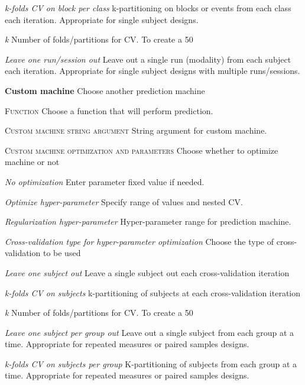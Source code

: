 \textit{k-folds CV on block per class}
k-partitioning on blocks or events from each class each iteration. Appropriate for single subject designs.


\textit{k}
Number of folds/partitions for CV. To create a 50%


\textit{Leave one run/session out}
Leave out a single run (modality) from each subject each iteration. Appropriate for single subject designs with multiple runs/sessions.


\textbf{Custom machine}
Choose another prediction machine


\textsc{Function}
Choose a function that will perform prediction.


\textsc{Custom machine string argument}
String argument for custom machine.


\textsc{Custom machine optimization and parameters}
Choose whether to optimize machine or not


\textsl{No optimization}
Enter parameter fixed value if needed.


\textsl{Optimize hyper-parameter}
Specify range of values and nested CV.


\textit{Regularization hyper-parameter}
Hyper-parameter range for prediction machine.


\textit{Cross-validation type for hyper-parameter optimization}
Choose the type of cross-validation to be used


\textit{Leave one subject out}
Leave a single subject out each cross-validation iteration


\textit{k-folds CV on subjects}
k-partitioning of subjects at each cross-validation iteration


\textit{k}
Number of folds/partitions for CV. To create a 50%


\textit{Leave one subject per group out}
Leave out a single subject from each group at a time. Appropriate for repeated measures or paired samples designs.


\textit{k-folds CV on subjects per group}
K-partitioning of subjects from each group at a time. Appropriate for repeated measures or paired samples designs.


